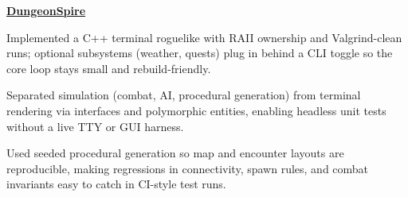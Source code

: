 \begin{twocolentry}{}
\href{https://github.com/faketut/DungeonSpire}{\textbf{DungeonSpire}}
\end{twocolentry}
\begin{onecolentry}
\begin{highlights}
\item Implemented a C++ terminal roguelike with RAII ownership and Valgrind-clean runs; optional subsystems (weather, quests) plug in behind a CLI toggle so the core loop stays small and rebuild-friendly.
\item Separated simulation (combat, AI, procedural generation) from terminal rendering via interfaces and polymorphic entities, enabling headless unit tests without a live TTY or GUI harness.
\item Used seeded procedural generation so map and encounter layouts are reproducible, making regressions in connectivity, spawn rules, and combat invariants easy to catch in CI-style test runs.
\end{highlights}
\end{onecolentry}
